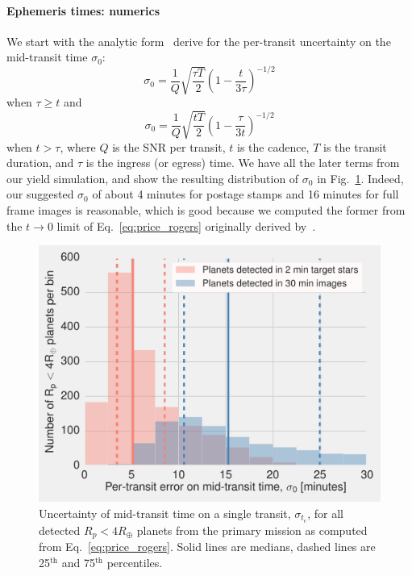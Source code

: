 \paragraph{Ephemeris times: numerics}
We start with the analytic form~\citet{price_transit_2014} derive for the per-transit uncertainty on the mid-transit time $\sigma_0$:
$$
\sigma_{0} = \frac{1}{Q} \sqrt{ \frac{\tau T}{2} } \left( 1 - \frac{t}{3\tau} \right)^{-1/2}
$$
when $\tau\geq t$ and 
\begin{equation}
\sigma_{0} = \frac{1}{Q} \sqrt{\frac{t T }{2}} \left( 1 - \frac{\tau}{3t} \right)^{-1/2}
\label{eq:price_rogers}
\end{equation}
when $t > \tau$,
where $Q$ is the SNR per transit, $t$ is the cadence, $T$ is the transit duration, and $\tau$ is the ingress (or egress) time.
We have all the later terms from our yield simulation, and show the resulting distribution of $\sigma_0$ in Fig.~\ref{fig:uncertainty_tc_hist}.
Indeed, our suggested $\sigma_0$ of about 4 minutes for postage stamps and 16 minutes for full frame images is reasonable, which is good because we computed the former from the $t\rightarrow0$ limit of Eq.~\ref{eq:price_rogers} originally derived by~\citet{carter_analytic_2008}.
\begin{figure}[!t]
	\centering
	\includegraphics[scale=1.]{figures/mid_transit_time_vs_cadence.pdf}
	\caption{Uncertainty of mid-transit time on a single transit, $\sigma_{t_c}$, for all detected $R_p<4R_\oplus$ planets from the primary mission as computed from Eq.~\protect\ref{eq:price_rogers}.
	Solid lines are medians, dashed lines are 25$^\mathrm{th}$ and 75$^\mathrm{th}$ percentiles.
	}
	\label{fig:uncertainty_tc_hist}
\end{figure}
